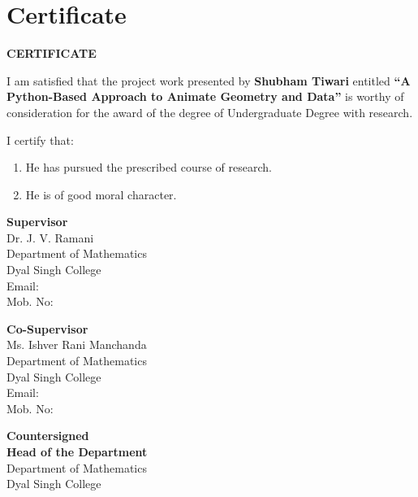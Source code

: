\documentclass[12pt, a4paper]{report}
\begin{document}
\chapter*{Certificate}

\begin{center}
    \textbf{CERTIFICATE}
\end{center}

\vspace{1cm}
I am satisfied that the project work presented by \textbf{Shubham Tiwari} entitled \textbf{``A Python-Based Approach to Animate Geometry and Data''} is worthy of consideration for the award of the degree of Undergraduate Degree with research.

\vspace{0.5cm}
I certify that:
\begin{enumerate}
    \item[(a)] He has pursued the prescribed course of research.
    \item[(b)] He is of good moral character.
\end{enumerate}

\vspace{3cm}

\begin{minipage}[t]{0.45\textwidth}
\begin{flushleft}
    \textbf{Supervisor}\\
    Dr. J. V. Ramani\\
    Department of Mathematics\\
    Dyal Singh College\\
    Email: \\
    Mob. No: 
\end{flushleft}
\end{minipage}
\hfill
\begin{minipage}[t]{0.45\textwidth}
\begin{flushleft}
    \textbf{Co-Supervisor}\\
    Ms. Ishver Rani Manchanda\\
    Department of Mathematics\\
    Dyal Singh College\\
    Email: \\
    Mob. No: 
\end{flushleft}
\end{minipage}

\vspace{3cm}
\begin{center}
    \textbf{Countersigned}\\[1.5cm]
    \textbf{Head of the Department}\\
    Department of Mathematics\\
    Dyal Singh College
\end{center}
\end{document}

